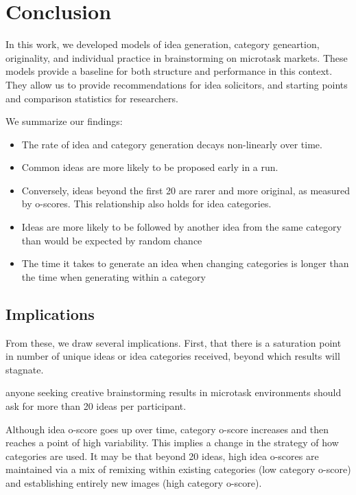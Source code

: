 \section{Conclusion}

In this work, we developed models of idea generation, category geneartion, originality, and individual practice in brainstorming on microtask markets.
These models provide a baseline for both structure and performance in this context. They allow us to provide recommendations for idea solicitors, and starting points and comparison statistics for researchers.

 We summarize our findings:

\begin{itemize}
\item The rate of idea and category generation decays non-linearly over time. 
\item Common ideas are more likely to be proposed early in a run. 
\item Conversely, ideas beyond the first 20 are rarer and more original, as measured by o-scores. This relationship also holds for idea categories.
\item Ideas are more likely to be followed by another idea from the same category than would be expected by random chance
\item The time it takes to generate an idea when changing categories is longer than the time when generating within a category
\end{itemize}

\subsection{Implications}

From these, we draw several implications. First, that there is a saturation point in number of unique ideas or idea categories received, beyond which results will stagnate.

anyone seeking creative brainstorming results in microtask environments should ask for more than 20 ideas per participant.

Although idea o-score goes up over time, category o-score increases and then reaches a point of high variability. This implies a change in the strategy of how categories are used. It may be that beyond 20 ideas, high idea o-scores are maintained via a mix of remixing within existing categories (low category o-score) and establishing entirely new images (high category o-score).



